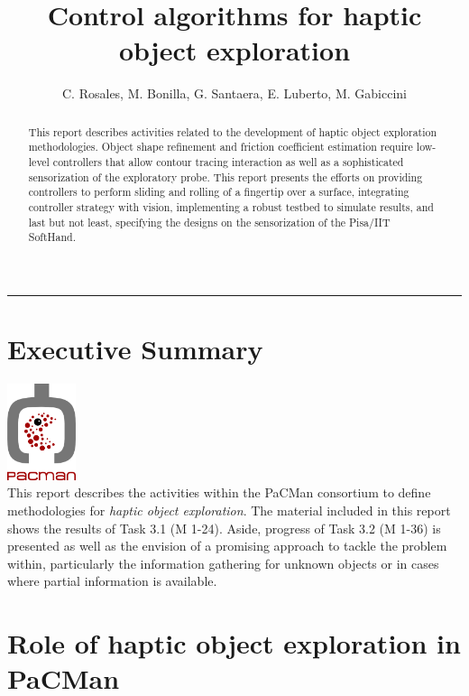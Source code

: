 \documentclass[a4paper,11pt,pdf]{pacmanreport}
\title{Control algorithms for haptic object exploration}
\author{C. Rosales, M. Bonilla, G. Santaera, E. Luberto, M. Gabiccini}
\begin{document}
\maketitle

\begin{abstract}
\noindent This report describes activities related to the development of haptic object exploration methodologies. Object shape refinement and friction coefficient estimation require low-level controllers that allow contour tracing interaction as well as a sophisticated sensorization of the exploratory probe. This report presents the efforts on providing controllers to perform sliding and rolling of a fingertip over a surface, integrating controller strategy with vision, implementing a robust testbed to simulate results, and last but not least, specifying the designs on the sensorization of the Pisa/IIT SoftHand.
\end{abstract}

\vspace{.2em}
\hrule

\footnotesize

\tableofcontents

\normalsize

\newpage

\section*{Executive Summary}
\includegraphics[height=80pt]{pacmanlogo.png}\\
This report describes the activities within the PaCMan consortium to define methodologies for \emph{haptic object exploration}. The material included in this report shows the results of Task 3.1 (M 1-24). Aside, progress of Task 3.2 (M 1-36) is presented as well as the envision of a promising approach to tackle the problem within, particularly the information gathering for unknown objects or in cases where partial information is available.

\section*{Role of haptic object exploration in PaCMan}
\end{document}
